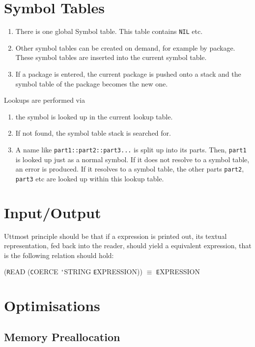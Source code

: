 \documentclass[12pt]{article}
\begin{document}
\section{Symbol Tables}

\begin{enumerate}
\item There is one global Symbol table. This table contains \texttt{NIL} etc.
\item Other symbol tables can be created on demand, for example by package.
These symbol tables are inserted into the current symbol table.
\item If a package is entered, the current package is pushed onto a stack and
the symbol table of the package becomes the new one.
\end{enumerate}

Lookups are performed via

\begin{enumerate}
\item the symbol is looked up in the current lookup table.
\item If not found, the symbol table stack is searched for.
\item A name like \texttt{part1::part2::part3...} is split up into its parts. Then,
\texttt{part1} is looked up just as a normal symbol. If it does not resolve to a symbol
table, an error is produced. If it resolves to a symbol table, the other parts
\texttt{part2}, \texttt{part3} etc are looked up within this lookup table.
\end{enumerate}


\section{Input/Output}

Uttmost principle should be that if a expression is printed out, its textual
representation, fed back into the reader, should yield a equivalent expression,
that is the following relation should hold:

({\texttt READ} ({\texttt COERCE} {\texttt 'STRING} {\texttt EXPRESSION})) $\equiv$ {\texttt EXPRESSION}


\section{Optimisations}

\subsection{Memory Preallocation}
\end{document}
